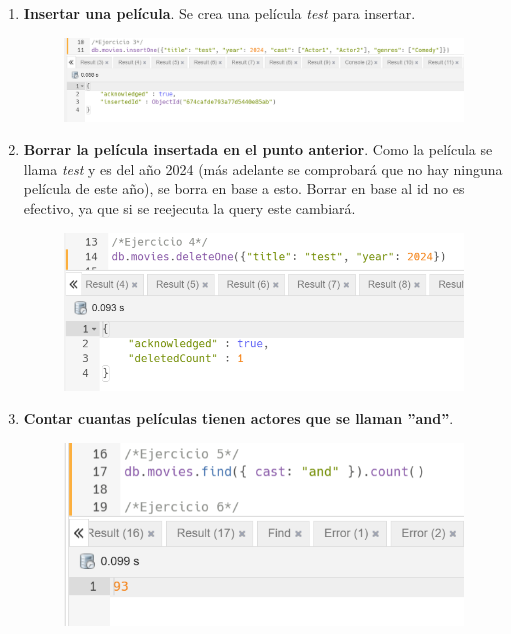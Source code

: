 \documentclass[a4paper,onecolumn]{article}
\begin{document}
\begin{sloppypar}
\begin{enumerate}
\begin{center}
\begin{figure}[H]
        \end{figure}
    \end{center}
    \item \textbf{Insertar una película}. Se crea una película \textit{test} para insertar.
    \begin{center}
        \begin{figure}[h!]
            \includegraphics[width=\textwidth]{querys/3.png}
        \end{figure}
    \end{center}
    \item \textbf{Borrar la película insertada en el punto anterior}. Como la película se llama \textit{test} y es del año 2024 (más adelante se comprobará
    que no hay ninguna película de este año), se borra en base a esto. Borrar en base al id no es efectivo, ya que si se reejecuta la query este cambiará.
    \begin{center}
        \begin{figure}[h!]
            \includegraphics[width=\textwidth]{querys/4.png}
        \end{figure}
    \end{center}
    \item \textbf{Contar cuantas películas tienen actores que se llaman ''and''}.
    \begin{center}
        \begin{figure}[H]
            \includegraphics[width=\textwidth]{querys/5.png}

\end{figure}
\end{center}
\end{enumerate}
\end{sloppypar}
\end{document}
